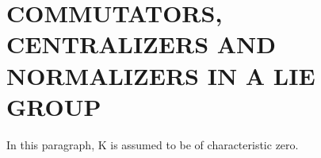 \section{COMMUTATORS, CENTRALIZERS AND NORMALIZERS IN A LIE GROUP}

In this paragraph, K is assumed to be of characteristic zero.

